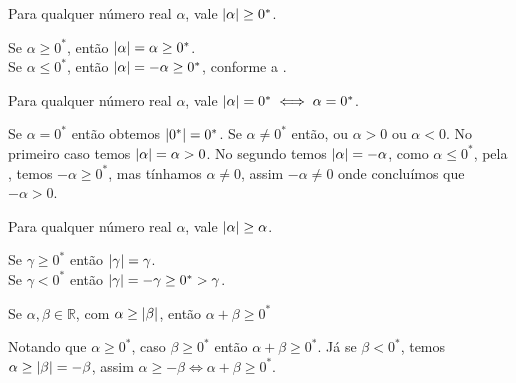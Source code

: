 \documentclass[../main.tex]{subfiles}
\begin{document}
\begin{teo}
    Para qualquer número real $\alpha$, vale $\abs{\alpha} \geq 0^*$.
\end{teo}
\begin{dem}
    Se $\alpha \geq 0^*$, então $\abs{\alpha} = \alpha \geq 0^*$. \\
    Se $\alpha \leq 0^*$, então $\abs{\alpha} = -\alpha \geq 0^*$, conforme a . 
\end{dem}
\begin{prop}\label{reais-prop-mod00}
    Para qualquer número real $\alpha$, vale $\abs{\alpha} = 0^* \iff \alpha = 0^*$.
\end{prop}
\begin{dem}
    Se $\alpha = 0^*$ então obtemos $\abs{0^*} = 0^*$. 
    Se $\alpha \neq 0^*$ então, ou $\alpha > 0$ ou $\alpha < 0$. No primeiro caso temos $\abs{\alpha} = \alpha > 0$. No segundo temos $\abs{\alpha} = -\alpha$, como $\alpha \leq 0^*$, pela , temos $-\alpha \geq 0^*$, mas tínhamos $\alpha \neq 0$, assim $-\alpha \neq 0$ onde concluímos que $-\alpha > 0$.
\end{dem}
\begin{prop}
    Para qualquer número real $\alpha$, vale $\abs{\alpha} \geq \alpha$.
\end{prop}
\begin{dem}
    Se $\gamma \geq 0^*$ então $\abs{\gamma} = \gamma$.\\
    Se $\gamma < 0^*$ então $\abs{\gamma} = -\gamma \geq 0^* > \gamma$.
\end{dem}
\begin{prop}\label{reais-prop-somaMod}
    Se $\alpha, \beta \in \mathbb{R}$, com $\alpha \geq \abs{\beta}$, então $\alpha + \beta \geq 0^*$
\end{prop}
\begin{dem}
    Notando que $\alpha \geq 0^*$, caso $\beta \geq 0^*$ então $\alpha + \beta \geq 0^*$. Já se $\beta < 0^*$, temos $\alpha \geq \abs{\beta} = -\beta$, assim $\alpha \geq -\beta \iff \alpha + \beta \geq 0^*$.
\end{dem}
\end{document}
